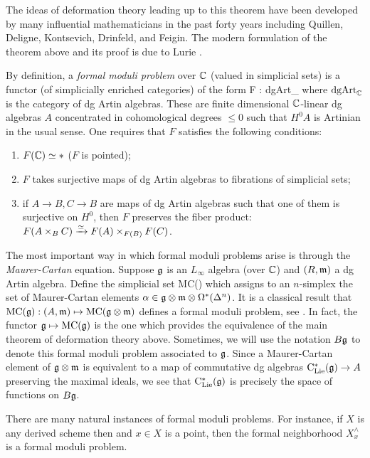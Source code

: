 The ideas of deformation theory leading up to this theorem have been developed by many influential mathematicians in the past forty years including Quillen, Deligne, Kontsevich, Drinfeld, and Feigin. 
The modern formulation of the theorem above and its proof is due to Lurie \cite{LurieDagX}.

By definition, a {\em formal moduli problem} over $\mathbb C$ (valued in simplicial sets) is a functor (of simplicially enriched categories) of the form
\ben
F : {\rm dgArt}_\CC {}
\een
where ${\rm dgArt}_{\mathbb C}$ is the category of dg Artin algebras. 
These are finite dimensional $\mathbb C$-linear dg algebras $A$ concentrated in cohomological degrees $\leq 0$ such that $H^0 A$ is Artinian in the usual sense.
One requires that $F$ satisfies the following conditions:
\begin{enumerate}
\item $F(\mathbb C) \simeq *$ ($F$ is pointed);
\item $F$ takes surjective maps of dg Artin algebras to fibrations of simplicial sets;
\item if $A\to B, C \to B$ are maps of dg Artin algebras such that one of them is surjective on $H^0$, then $F$ preserves the fiber product: $F(A \times_B C) \xrightarrow{\simeq} F(A) \times_{F(B)} F(C)$.
\end{enumerate}

The most important way in which formal moduli problems arise is through the {\em Maurer-Cartan} equation.
Suppose $\mathfrak g$ is an $L_\infty$ algebra (over $\mathbb C$) and $(R,{\mathfrak m})$ a dg Artin algebra.
Define the simplicial set
\ben
{\rm MC}(\fg \tensor \fm) 
\een
which assigns to an $n$-simplex the set of Maurer-Cartan elements $\alpha \in \mathfrak g \otimes {\mathfrak m} \otimes \Omega^*(\Delta^n)$. 
It is a classical result that ${\rm MC}(\mathfrak g) : (A, {\mathfrak m}) \mapsto {\rm MC}(\mathfrak g \otimes {\mathfrak m})$ defines a formal moduli problem, see \cite{GetzlerLie}.
In fact, the functor $\mathfrak g \mapsto {\rm MC}(\mathfrak g)$ is the one which provides the equivalence of the main theorem of deformation theory above. 
Sometimes, we will use the notation $B \mathfrak g$ to denote this formal moduli problem associated to $\mathfrak g$.
Since a Maurer-Cartan element of $\mathfrak g \otimes {\mathfrak m}$ is equivalent to a map of commutative dg algebras ${\rm C}_{{\rm Lie}}^*(\mathfrak g) \to A$ preserving the maximal ideals, we see that ${\rm C}_{{\rm Lie}}^*(\mathfrak g)$ is precisely the space of functions on $B \mathfrak g$.

\begin{rmk} 
There are many natural instances of formal moduli problems.
For instance, if $X$ is any derived scheme then and $x \in X$ is a point, then the formal neighborhood $X^{\wedge}_x$ is a formal moduli problem.
\end{rmk}

